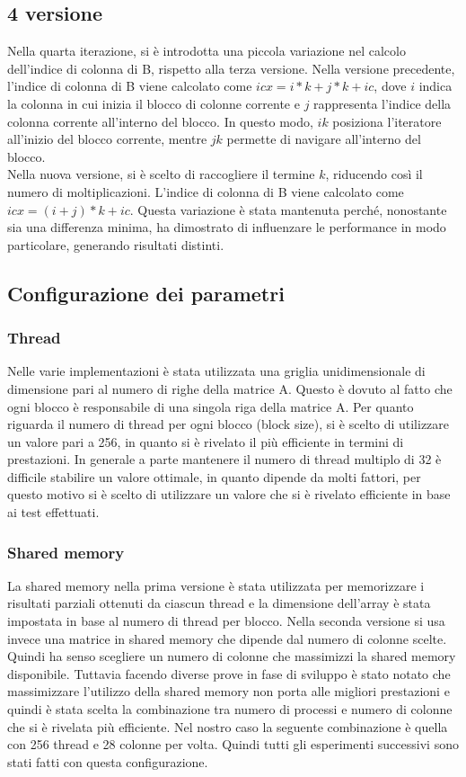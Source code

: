 \documentclass[conference]{IEEEtran}
\begin{document}
\subsection{4 versione}
Nella quarta iterazione, si è introdotta una piccola variazione nel calcolo dell'indice di colonna di B, rispetto alla terza versione. Nella versione precedente, l'indice di colonna di B viene calcolato come $icx = i * k + j * k + ic$, dove $i$ indica la colonna in cui inizia il blocco di colonne corrente e $j$ rappresenta l'indice della colonna corrente all'interno del blocco. In questo modo, $ik$ posiziona l'iteratore all'inizio del blocco corrente, mentre $jk$ permette di navigare all'interno del blocco. \\ Nella nuova versione, si è scelto di raccogliere il termine $k$, riducendo così il numero di moltiplicazioni. L'indice di colonna di B viene calcolato come $icx = (i + j) * k + ic$. Questa variazione è stata mantenuta perché, nonostante sia una differenza minima, ha dimostrato di influenzare le performance in modo particolare, generando risultati distinti.

\subsection{Configurazione dei parametri}
\subsubsection{Thread}
Nelle varie implementazioni è stata utilizzata una griglia unidimensionale di dimensione pari al numero di righe della matrice A. Questo è dovuto al fatto che ogni blocco è responsabile di una singola riga della matrice A. 
Per quanto riguarda il numero di thread per ogni blocco (block size), si è scelto di utilizzare un valore pari a 256, in quanto si è rivelato il più efficiente in termini di prestazioni. In generale a parte mantenere il numero di thread multiplo di 32 è difficile stabilire un valore ottimale, in quanto dipende da molti fattori, per questo motivo si è scelto di utilizzare un valore che si è rivelato efficiente in base ai test effettuati.
\subsubsection{Shared memory}
La shared memory nella prima versione è stata utilizzata per memorizzare i risultati parziali ottenuti da ciascun thread e la dimensione dell'array è stata impostata in base al numero di thread per blocco. Nella seconda versione si usa invece una matrice in shared memory che dipende dal numero di colonne scelte. Quindi ha senso scegliere un numero di colonne che massimizzi la shared memory disponibile. Tuttavia facendo diverse prove in fase di sviluppo è stato notato che massimizzare l'utilizzo della shared memory non porta alle migliori prestazioni e quindi è stata scelta la combinazione tra numero di processi e numero di colonne che si è rivelata più efficiente. Nel nostro caso la seguente combinazione è quella con 256 thread e 28 colonne per volta. Quindi tutti gli esperimenti successivi sono stati fatti con questa configurazione.
\end{document}
